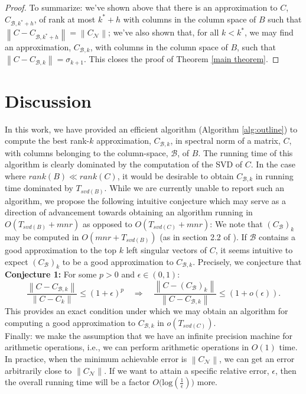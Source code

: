 \documentclass[11pt]{article}
\newcommand{\norm}[1]{\left\|#1\right\|}
\newcommand{\B}{\mathcal{B}}
\newcommand{\N}{\mathcal{N}}
\newcommand{\0}{\ensuremath{\mathbf{0}}}
\renewcommand{\>}{\succ}
\newcommand{\<}{\prec}
\begin{document}
\begin{proof}
\noindent To summarize: we've shown above that there is an approximation to $C$, $C_{\B, k^* + h}$, of rank at most $k^* + h$ with columns in the column space of $B$ such that $\norm{C - C_{\B, k^* + h}} = \norm{C_{\N}}$; we've also shown that, for all $k < k^*$, we may find an approximation, $C_{\B, k}$, with columns in the column space of $B$, such that $\norm{C - C_{\B, k}} = \sigma_{k+1}$. This closes the proof of Theorem \ref{main theorem}.
\end{proof}

\section{Discussion}
In this work, we have provided an efficient algorithm (Algorithm \ref{alg:outline}) to compute the best rank-$k$ approximation, $C_{\B, k}$, in spectral norm of a matrix, $C$, with columns belonging to the column-space, $\B$, of $B$. The running time of this algorithm is clearly dominated by the computation of the SVD of $C$. In the case where $rank(B) \ll rank(C)$, it would be desirable to obtain $C_{\B, k}$ in running time dominated by $T_{svd(B)}$. While we are currently unable to report such an algorithm, we propose the following intuitive conjecture which may serve as a direction of advancement towards obtaining an algorithm running in $O(T_{svd(B)} + mnr)$ as opposed to $O(T_{svd(C)} + mnr)$: We note that $(C_{\B})_k$ may be computed in $O(mnr + T_{svd(B)})$ (as in section 2.2 of \cite{BDM}). If $\B$ contains a good approximation to the top $k$ left singular vectors of $C$, it seems intuitive to expect $(C_{\B})_k$ to be a good approximation to $C_{\B, k}$. Precisely, we conjecture that\\
\textbf{Conjecture 1:} For some $p > 0$ and $\epsilon \in (0, 1)$:\\
\[ \frac{\norm{{C} - C_{\B, k}}}{\norm{C - C_k}} \leq (1+\epsilon)^p \quad \Rightarrow \quad
\frac{\norm{{C} - (C_{\B})_k} }{\norm{C - C_{\B, k}}}\leq (1+o(\epsilon)). \]
This provides an exact condition under which we may obtain an algorithm for computing a good approximation to $C_{\B, k}$ in $o(T_{svd(C)})$.\\

Finally: we make the assumption that we have an infinite precision machine for arithmetic operations, i.e., we can perform arithmetic operations in $O(1)$ time. In practice, when the minimum achievable error is $\norm{C_{\N}}$, we can get an error arbitrarily close to $\norm{C_{\N}}$. If we want to attain a specific relative error, $\epsilon$,  then the overall running time will be a factor $O\Big(\text{log}(\frac{1}{\epsilon})\Big)$ more.  

\end{document}
